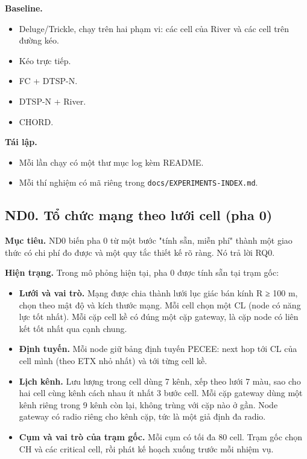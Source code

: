 \textbf{Baseline.}

\begin{itemize}
\tightlist
\item
  Deluge/Trickle, chạy trên hai phạm vi: các cell của River và các cell
  trên đường kéo.
\item
  Kéo trực tiếp.
\item
  FC + DTSP-N.
\item
  DTSP-N + River.
\item
  CHORD.
\end{itemize}

\textbf{Tái lập.}

\begin{itemize}
\tightlist
\item
  Mỗi lần chạy có một thư mục log kèm README.
\item
  Mỗi thí nghiệm có mã riêng trong \texttt{docs/EXPERIMENTS-INDEX.md}.
\end{itemize}

\subsection{ND0. Tổ chức mạng theo lưới cell (pha 0)}

\textbf{Mục tiêu.} ND0 biến pha 0 từ một bước "tính sẵn, miễn phí" thành
một giao thức có chi phí đo được và một quy tắc thiết kế rõ ràng. Nó trả
lời RQ0.

\textbf{Hiện trạng.} Trong mô phỏng hiện tại, pha 0 được tính sẵn tại
trạm gốc:

\begin{itemize}
\tightlist
\item
  \textbf{Lưới và vai trò.} Mạng được chia thành lưới lục giác bán kính
  R ≥ 100 m, chọn theo mật độ và kích thước mạng. Mỗi cell chọn một CL
  (node có năng lực tốt nhất). Mỗi cặp cell kề có đúng một cặp gateway,
  là cặp node có liên kết tốt nhất qua cạnh chung.
\item
  \textbf{Định tuyến.} Mỗi node giữ bảng định tuyến PECEE: next hop tới
  CL của cell mình (theo ETX nhỏ nhất) và tới từng cell kề.
\item
  \textbf{Lịch kênh.} Lưu lượng trong cell dùng 7 kênh, xếp theo lưới 7
  màu, sao cho hai cell cùng kênh cách nhau ít nhất 3 bước cell. Mỗi cặp
  gateway dùng một kênh riêng trong 9 kênh còn lại, không trùng với cặp
  nào ở gần. Node gateway có radio riêng cho kênh cặp, tức là một giả
  định đa radio.
\item
  \textbf{Cụm và vai trò của trạm gốc.} Mỗi cụm có tối đa 80 cell. Trạm
  gốc chọn CH và các critical cell, rồi phát kế hoạch xuống trước mỗi
  nhiệm vụ.
\end{itemize}

